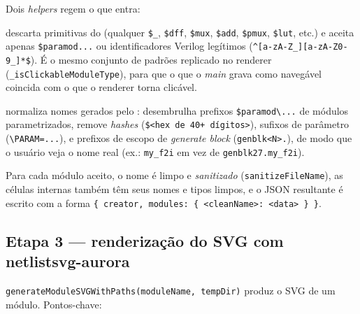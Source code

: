 Dois \emph{helpers} regem o que entra:

\begin{description}[leftmargin=1.4em,style=nextline]
  \item[\lstinline|isClickableModule(name)|] descarta primitivas do 
        (qualquer \lstinline|$_|, \lstinline|$dff|, \lstinline|$mux|,
        \lstinline|$add|, \lstinline|$pmux|, \lstinline|$lut|, etc.) e aceita
        apenas \lstinline|$paramod...| ou identificadores Verilog legítimos
        (\lstinline|^[a-zA-Z_][a-zA-Z0-9_]*$|). É o mesmo conjunto de padrões
        replicado no renderer (\lstinline|_isClickableModuleType|), para que o
        que o \emph{main} grava como navegável coincida com o que o renderer
        torna clicável.
  \item[\lstinline|cleanModuleName(name)|] normaliza nomes gerados pelo
        : desembrulha prefixos \lstinline|$paramod\...| de módulos
        parametrizados, remove \emph{hashes} (\lstinline|$<hex de 40+ dígitos>|),
        sufixos de parâmetro (\lstinline|\PARAM=...|), e prefixos de escopo de
        \emph{generate block} (\lstinline|genblk<N>.|), de modo que o usuário veja
        o nome real (ex.: \lstinline|my_f2i| em vez de
        \lstinline|genblk27.my_f2i|).
\end{description}

Para cada módulo aceito, o nome é limpo e \emph{sanitizado}
(\lstinline|sanitizeFileName|), as células internas também têm seus nomes e tipos
limpos, e o JSON resultante é escrito com a forma
\lstinline|{ creator, modules: { <cleanName>: <data> } }|.

\subsection{Etapa 3 --- renderização do SVG com netlistsvg-aurora}

\lstinline|generateModuleSVGWithPaths(moduleName, tempDir)| produz o SVG de um
módulo. Pontos-chave:


